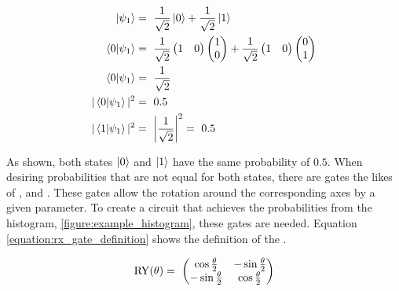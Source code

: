 \begin{equation}
    \centering
    \begin{split}
        \ket{\psi_1} &=\ \frac{1}{\sqrt{2}}\ket{0} + \frac{1}{\sqrt{2}}\ket{1}\\
        \bra{0}\ket{\psi_1} &=\ \frac{1}{\sqrt{2}}\begin{pmatrix}1 & 0 \end{pmatrix}\begin{pmatrix}1 \\ 0 \end{pmatrix} + \frac{1}{\sqrt{2}}\begin{pmatrix}1 & 0 \end{pmatrix}\begin{pmatrix}0 \\ 1 \end{pmatrix} \\
        \bra{0}\ket{\psi_1} &=\ \frac{1}{\sqrt{2}}\\
        |\bra{0}\ket{\psi_1}|^2 &=\ 0.5\\
        |\bra{1}\ket{\psi_1}|^2 &=\ \left|\frac{1}{\sqrt{2}}\right|^2 =\ 0.5\\
    \end{split}
    \label{equation:basic_h_measurement}
\end{equation}

As shown, both states $\ket{0}$ and $\ket{1}$ have the same probability of $0.5$. When desiring probabilities that are not equal for both states, there are gates the likes of \rygate\cite{qiskit_rygate_nodate}, \rxgate\cite{qiskit_rxgate_nodate} and \rzgate\cite{qiskit_rzgate_nodate}. These gates allow the rotation around the corresponding axes by a given parameter. To create a circuit that achieves the probabilities from the histogram, \ref{figure:example_histogram}, these gates are needed. Equation \ref{equation:rx_gate_definition} shows the definition of the \rygate.

\begin{equation}
    \centering
    \begin{split}
        \mathrm{RY}(\theta) =\ \begin{pmatrix} \cos{\frac{\theta}{2}}   & -\sin{\frac{\theta}{2}} \\
        -\sin{\frac{\theta}{2}} & \cos{\frac{\theta}{2}}
    \end{pmatrix}
    \end{split}
    \label{equation:rx_gate_definition}
\end{equation}

